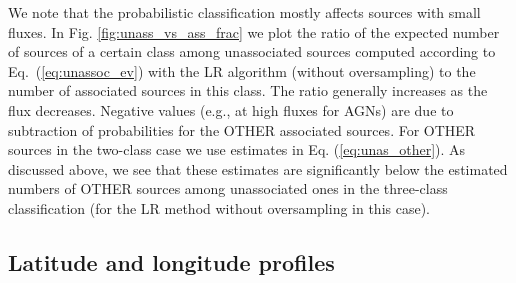\documentclass[referee]{aa} %
\newcommand{\lb}{\label}
\begin{document}
We note that the probabilistic classification mostly affects sources with small fluxes.
In Fig. \ref{fig:unass_vs_ass_frac} we plot the ratio of the expected number of sources of a certain class among unassociated sources
computed according to Eq.~(\ref{eq:unassoc_ev}) with the LR algorithm (without oversampling) to the number of associated sources in this class.
The ratio generally increases as the flux decreases.
Negative values (e.g., at high fluxes for AGNs) are due to subtraction of probabilities for the OTHER associated sources.
For OTHER sources in the two-class case we use estimates in Eq. (\ref{eq:unas_other}).
As discussed above, we see that these estimates are significantly below the estimated numbers of OTHER sources among unassociated ones in the three-class classification (for the LR method without oversampling in this case).


\subsection{Latitude and longitude profiles}
\lb{sec:lat-lon-profiles}
\end{document}
